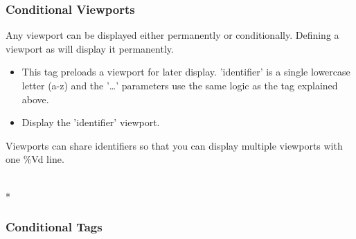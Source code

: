 {\subsubsection{Conditional Viewports}

Any viewport can be displayed either permanently or conditionally.
Defining a viewport as 
will display it permanently.

\begin{itemize}
\item {}
This tag preloads a viewport for later display. 'identifier' is a single
lowercase letter (a-z) and the '\dots' parameters use the same logic as
the  tag explained above.
\item {} Display the 'identifier' viewport.
\end{itemize}

Viewports can share identifiers so that you can display multiple viewports
with one \%Vd line.

\\*

}

\subsubsection{Conditional Tags}


